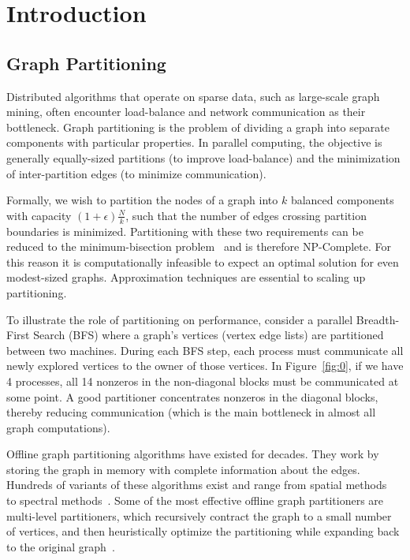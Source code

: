 \section{Introduction}
\subsection{Graph Partitioning}
Distributed algorithms that operate on sparse data, such as large-scale graph mining, often encounter load-balance and network communication as their bottleneck. 
Graph partitioning is the problem of dividing a graph into separate components with particular properties. 
In parallel computing, the objective is generally equally-sized partitions (to improve load-balance) and the minimization of inter-partition edges (to minimize communication).

Formally, we wish to partition the nodes of a graph into $k$ balanced components with capacity $(1+\epsilon)\frac{N}{k}$, such that the number of edges crossing partition boundaries is minimized. 
Partitioning with these two requirements can be reduced to the minimum-bisection problem~\cite{Garey:1979:CIG:578533} and is therefore NP-Complete. 
For this reason it is computationally infeasible to expect an optimal solution for even modest-sized graphs.
Approximation techniques are essential to scaling up partitioning.

To illustrate the role of partitioning on performance, consider a parallel Breadth-First Search (BFS) where a graph's vertices (vertex edge lists) are partitioned between two machines. During each BFS step, each process must communicate all newly explored vertices to the owner of those vertices.
In Figure~\ref{fig:0}, if we have 4 processes, all 14 nonzeros in the non-diagonal blocks must be communicated at some point.
A good partitioner concentrates nonzeros in the diagonal blocks, thereby reducing communication (which is the main bottleneck in almost all graph computations).

Offline graph partitioning algorithms have existed for decades.
They work by storing the graph in memory with complete information about the edges.
Hundreds of variants of these algorithms exist and range from spatial methods~\cite{Gilbert95geometricmesh} to spectral methods~\cite{arora2009expander}.
Some of the most effective offline graph partitioners are multi-level partitioners, which recursively contract the graph to a small number of vertices, and then heuristically optimize the partitioning while expanding back to the original graph~\cite{karypis1998multilevel}.

